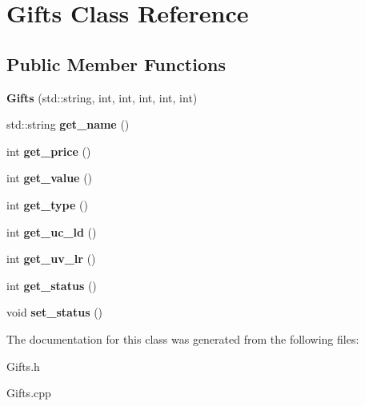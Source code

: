 \hypertarget{classGifts}{}\section{Gifts Class Reference}
\label{classGifts}
\subsection*{Public Member Functions}
\begin{DoxyCompactItemize}
\item 
{\bfseries Gifts} (std\+::string, int, int, int, int, int)\hypertarget{classGifts_ac20af97c7cb3f3fde42e09ee13df4c27}{}\label{classGifts_ac20af97c7cb3f3fde42e09ee13df4c27}

\item 
std\+::string {\bfseries get\+\_\+name} ()\hypertarget{classGifts_a8af4586e5323c518854e03ec0a23b76f}{}\label{classGifts_a8af4586e5323c518854e03ec0a23b76f}

\item 
int {\bfseries get\+\_\+price} ()\hypertarget{classGifts_a1c508c0ee7e7a5dcda8f0d2f79906497}{}\label{classGifts_a1c508c0ee7e7a5dcda8f0d2f79906497}

\item 
int {\bfseries get\+\_\+value} ()\hypertarget{classGifts_a9a6301c4a15c0fa938eb6768be09ddc5}{}\label{classGifts_a9a6301c4a15c0fa938eb6768be09ddc5}

\item 
int {\bfseries get\+\_\+type} ()\hypertarget{classGifts_a3222a4905d833c5729bfbdab4f825851}{}\label{classGifts_a3222a4905d833c5729bfbdab4f825851}

\item 
int {\bfseries get\+\_\+uc\+\_\+ld} ()\hypertarget{classGifts_aa2080ac13776ef754d1f611b067c08dd}{}\label{classGifts_aa2080ac13776ef754d1f611b067c08dd}

\item 
int {\bfseries get\+\_\+uv\+\_\+lr} ()\hypertarget{classGifts_a92f066dbc5d1283c3aff71b673f01b93}{}\label{classGifts_a92f066dbc5d1283c3aff71b673f01b93}

\item 
int {\bfseries get\+\_\+status} ()\hypertarget{classGifts_aa8c12739f28454ac0db2338c181bcd18}{}\label{classGifts_aa8c12739f28454ac0db2338c181bcd18}

\item 
void {\bfseries set\+\_\+status} ()\hypertarget{classGifts_ab002cdbd5d2b418248aaeb8456991e9e}{}\label{classGifts_ab002cdbd5d2b418248aaeb8456991e9e}

\end{DoxyCompactItemize}


The documentation for this class was generated from the following files\+:\begin{DoxyCompactItemize}
\item 
Gifts.\+h\item 
Gifts.\+cpp\end{DoxyCompactItemize}
